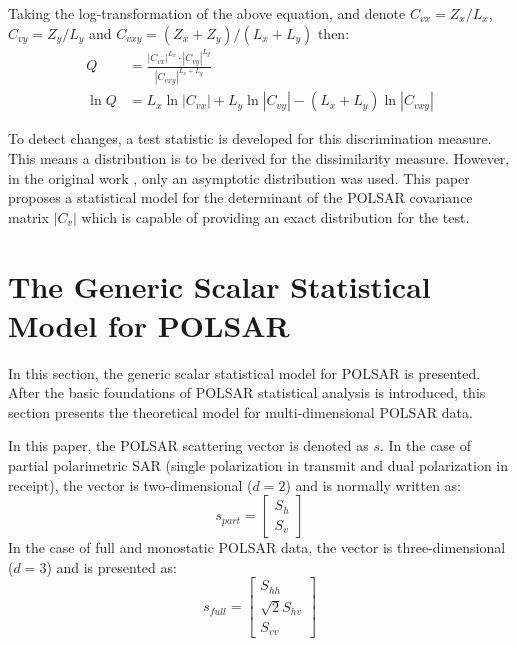 \documentclass[journal]{IEEEtran}
\begin{document}
Taking the log-transformation of the above equation, and denote $C_{vx} = Z_x / L_x$, $C_{vy} = Z_y / L_y$ and $C_{vxy} = (Z_x + Z_y)/(L_x + L_y)$ then:
{\small
\begin{align}
  Q &= \frac{|C_{vx}|^{L_x} \cdot |C_{vy}|^{L_y} }{|C_{vxy}|^{L_x + L_y}} \label{eqn:ori_likelyhood_stats} \\
  \ln Q &= L_x \ln |C_{vx}| + L_y \ln |C_{vy}| - (L_x + L_y) \ln |C_{vxy}| \label{eqn:log_likelyhood_stats}
\end{align}
}

To detect changes, a test statistic is developed for this discrimination measure.
This means a distribution is to be derived for the dissimilarity measure.
However, in the original work \cite{Conradsen_2003_TGRS_4}, only an asymptotic distribution was used.
This paper proposes a statistical model for the determinant of the POLSAR covariance matrix $|C_v|$
  which is capable of providing an exact distribution for the test.

\section{The Generic Scalar Statistical Model for POLSAR}  
\label{sec:theoretical_model}

In this section, the generic scalar statistical model for POLSAR is presented.
After the basic foundations of POLSAR statistical analysis is introduced,
  this section presents the theoretical model for multi-dimensional POLSAR data. 

In this paper, the POLSAR scattering vector is denoted as $s$.
In the case of partial polarimetric SAR (single polarization in transmit and dual polarization in receipt),
  the vector is two-dimensional ($d=2$) and is normally written as: 
\begin{equation}
s_{part}=\begin{bmatrix}
S_h\\ 
S_v
\end{bmatrix}
\end{equation}
In the case of full and monostatic POLSAR data,
  the vector is three-dimensional ($d=3$) and is presented as:
\begin{equation}
s_{full}=\begin{bmatrix}
S_{hh}\\
\sqrt{2}S_{hv}\\
S_{vv}
\end{bmatrix}
\end{equation}
\end{document}
